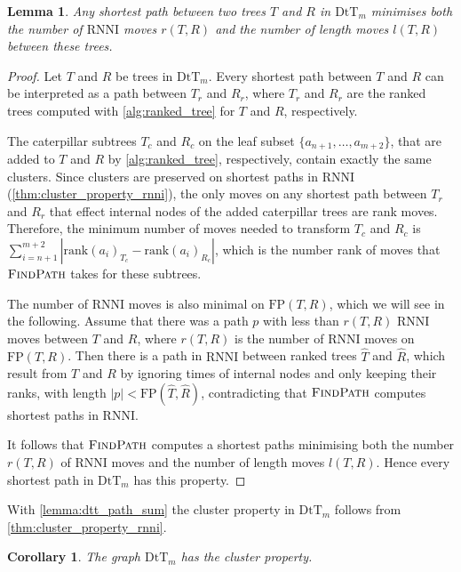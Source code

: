 \documentclass[11pt]{amsart}
\newtheorem{lemma}{Lemma}
\newtheorem{corollary}{Corollary}
\newcommand{\rnni}{\mathrm{RNNI}}
\newcommand{\findpath}{\textsc{FindPath}}
\newcommand{\rank}{\mathrm{rank}}
\newcommand{\fp}{\mathrm{FP}}
\newcommand{\dtt}{\mathrm{DtT}}
\begin{document}

\begin{lemma}
	Any shortest path between two trees $T$ and $R$ in $\dtt_m$ minimises both the number of $\rnni$ moves $r(T,R)$ and the number of length moves $l(T,R)$ between these trees.
	\label{lemma:dtt_path_sum}
\end{lemma}

\begin{proof}
	Let $T$ and $R$ be trees in $\dtt_m$.
	Every shortest path between $T$ and $R$ can be interpreted as a path between $T_r$ and $R_r$, where $T_r$ and $R_r$ are the ranked trees computed with \autoref{alg:ranked_tree} for $T$ and $R$, respectively.

	The caterpillar subtrees $T_c$ and $R_c$ on the leaf subset $\{a_{n+1}, \ldots, a_{m+2}\}$, that are added to $T$ and $R$ by \autoref{alg:ranked_tree}, respectively, contain exactly the same clusters.
	Since clusters are preserved on shortest paths in $\rnni$ (\autoref{thm:cluster_property_rnni}), the only moves on any shortest path between $T_r$ and $R_r$ that effect internal nodes of the added caterpillar trees are rank moves.
	Therefore, the minimum number of moves needed to transform $T_c$ and $R_c$ is $\sum_{i = n+1}^{m+2} |\rank(a_{i})_{T_c} - \rank(a_{i})_{R_c}|$, which is the number rank of moves that $\findpath$ takes for these subtrees.

	The number of $\rnni$ moves is also minimal on $\fp(T,R)$, which we will see in the following.
	Assume that there was a path $p$ with less than $r(T,R)$ $\rnni$ moves between $T$ and $R$, where $r(T,R)$ is the number of $\rnni$ moves on $\fp(T,R)$.
	Then there is a path in $\rnni$ between ranked trees $\hat T$ and $\hat R$, which result from $T$ and $R$ by ignoring times of internal nodes and only keeping their ranks, with length $|p| < \fp(\hat T, \hat R)$, contradicting that $\findpath$ computes shortest paths in $\rnni$.

	It follows that $\findpath$ computes a shortest paths minimising both the number $r(T,R)$ of $\rnni$ moves and the number of length moves $l(T,R)$.
	Hence every shortest path in $\dtt_m$ has this property.
\end{proof}

With \autoref{lemma:dtt_path_sum} the cluster property in $\dtt_m$ follows from \autoref{thm:cluster_property_rnni}.

\begin{corollary}
	The graph $\dtt_m$ has the cluster property.
\end{corollary}
\end{document}
